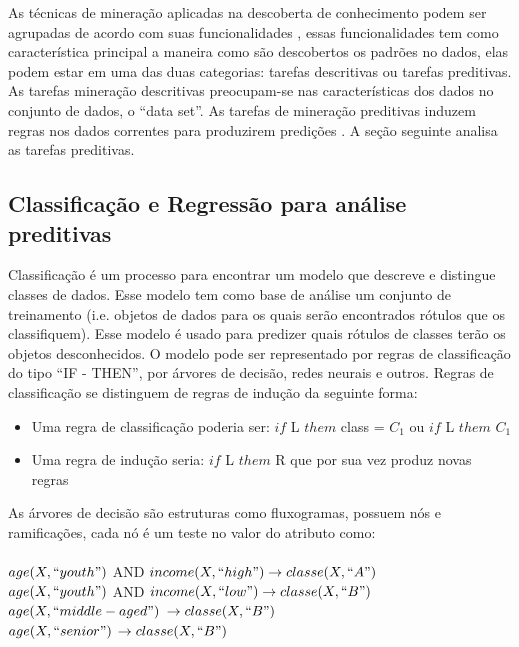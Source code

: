 As técnicas de mineração aplicadas na descoberta de conhecimento podem ser agrupadas de acordo com suas funcionalidades \cite{DataMining2}, 
essas funcionalidades tem como característica principal a maneira como são descobertos os padrões no dados, elas podem estar 
em uma das duas categorias: tarefas descritivas ou tarefas preditivas. As tarefas mineração descritivas preocupam-se nas características 
dos dados no conjunto de dados, o ``data set''. As tarefas de mineração preditivas induzem regras nos dados correntes para produzirem 
predições \cite{DataMining2}. A seção seguinte analisa as tarefas preditivas.

\subsection{Classificação e Regressão para análise preditivas}

Classificação é um processo para encontrar um modelo que descreve e distingue classes de dados. 
Esse modelo tem como base de análise um conjunto de treinamento (i.e. objetos de dados para os quais 
serão encontrados rótulos que os classifiquem). 
Esse modelo é usado para predizer quais rótulos de classes terão os objetos desconhecidos.
O modelo pode ser representado por regras de classificação do tipo ``IF - THEN'', por árvores de decisão, redes neurais e outros. 
Regras de classificação se distinguem de regras de indução da seguinte forma:
\begin{itemize}
 \item Uma regra de classificação poderia ser: $if$ L $them$ class = $C_{1}$ ou $if$ L $them$  $C_{1}$
 \item Uma regra de indução seria: $ if$ L $them$ R que por sua vez produz novas regras 
\end{itemize}

As árvores de decisão são estruturas como fluxogramas, possuem nós e ramificações, 
cada nó é um teste no valor do atributo como:\\
\\
  $age(X,``youth")$ AND $income(X,``high")  \to classe (X,``A")$\\
  $age(X,``youth")$ AND $income(X,``low") \to classe (X,``B")$\\
  $age(X,``middle-aged")$  $\to classe (X,``B")$\\
  $age(X,``senior")$       $ \to classe (X,``B")$\\

\pagebreak
  
